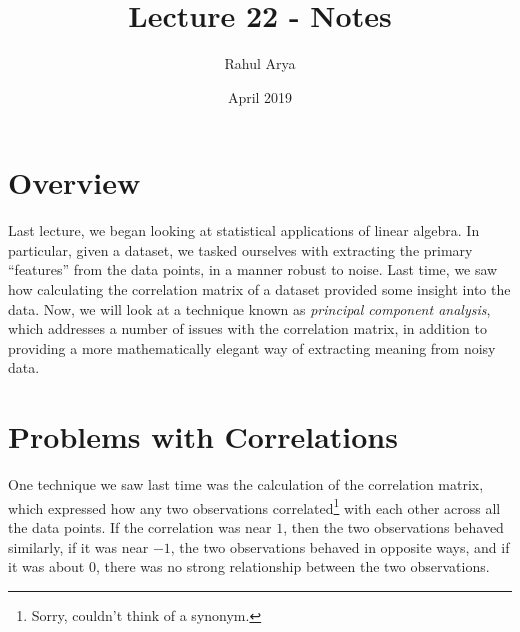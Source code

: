 \documentclass[letterpaper]{article}
\title{Lecture 22 - Notes}
\author{Rahul Arya}
\date{April 2019}
\theoremstyle{remark}
\begin{document}
\maketitle

\section{Overview}
Last lecture, we began looking at statistical applications of linear algebra. In particular, given a dataset, we tasked ourselves with extracting the primary ``features'' from the data points, in a manner robust to noise. Last time, we saw how calculating the correlation matrix of a dataset provided some insight into the data. Now, we will look at a technique known as \emph{principal component analysis}, which addresses a number of issues with the correlation matrix, in addition to providing a more mathematically elegant way of extracting meaning from noisy data.

\section{Problems with Correlations}
One technique we saw last time was the calculation of the correlation matrix, which expressed how any two observations correlated\footnote{Sorry, couldn't think of a synonym.} with each other across all the data points. If the correlation was near $1$, then the two observations behaved similarly, if it was near $-1$, the two observations behaved in opposite ways, and if it was about $0$, there was no strong relationship between the two observations. 
\end{document}
